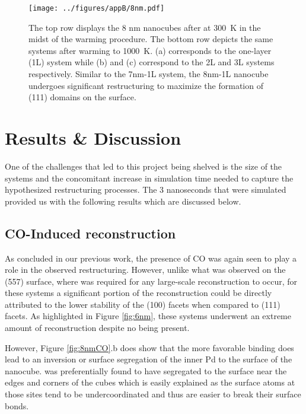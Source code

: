 \begin{landscape}
\begin{figure}[p!]
\centering
  \texttt{[image: ../figures/appB/8nm.pdf]}
  \caption{The top row displays the 8 nm nanocubes after at 300~K in the midst of the warming procedure. 
The bottom row depicts the same systems after warming to
1000~K.  (a) corresponds to the one-layer (1L) system while (b) and (c)
correspond to the 2L and 3L systems respectively. Similar to the 7nm-1L system,
the 8nm-1L nanocube undergoes significant restructuring to maximize the
formation of (111) domains on the surface.}
  \label{fig:8nm}
\end{figure}
\end{landscape}



\section{Results \& Discussion}
One of the challenges that led to this project being shelved is the size of the
systems and the concomitant increase in simulation time needed to capture the
hypothesized restructuring processes. The 3 nanoseconds that were simulated
provided us with the following results which are discussed below.


\subsection{CO-Induced reconstruction}
As concluded in our previous work\citep{Michalka:2013aa}, the presence of CO was again
seen to play a role in the observed restructuring. However, unlike what was
observed on the  (557) surface, where  was
required for any large-scale reconstruction to occur, for these systems a
significant portion of the reconstruction could be directly attributed to the lower
stability of the (100) facets when compared to (111) facets. As highlighted in
Figure \ref{fig:6nm}, these systems underwent an extreme amount of
reconstruction despite no  being present. 

However, Figure \ref{fig:8nmCO}.b does show that the more favorable
 binding does lead to an inversion or surface segregation of
the inner Pd to the surface of the nanocube.  was preferentially found
to have segregated to the surface near the edges and corners of the cubes which
is easily explained as the surface atoms at those sites tend to be
undercoordinated and thus are easier to break their surface bonds.

